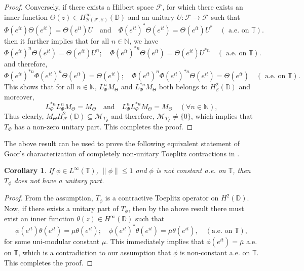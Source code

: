 \documentclass[12pt]{amsart}
\numberwithin{equation}{section}
\newtheorem{cor}[propn]{Corollary}
\theoremstyle{definition}
\newcommand{\Nat}{\mathbb{N}}
\newcommand{\D}{\mathbb{D}}
\newcommand{\T}{\mathbb{T}}
\newcommand{\1}{{\mbox{\bf 1}}}
\newcommand{\clb}{\mathcal{B}}
\newcommand{\cle}{\mathcal{E}}
\newcommand{\clf}{\mathcal{F}}
\newcommand{\clm}{\mathcal{M}}
\newcommand{\raro}{\rightarrow}
\begin{document}
\begin{proof}
Conversely, if there exists a Hilbert space $\clf$, for which there exists an inner function $\Theta(z) \in H_{\clb(\clf, \cle)}^{\infty}(\D)$ and an unitary $U: \clf \raro \clf$ such that
\[
\Phi(e^{it}) \Theta(e^{it}) = \Theta(e^{it}) U \quad \text{and} \quad  \Phi(e^{it})^* \Theta(e^{it}) = \Theta(e^{it}) U^* \quad (\text{ a.e. on }\T).
\]
then it further implies that for all $n \in \Nat$, we have
\begin{equation}
\Phi(e^{it})^n \Theta(e^{it}) =  \Theta(e^{it}) U^{n}; \quad \Phi(e^{it})^{*n} \Theta(e^{it}) =  \Theta(e^{it}) U^{*n} \quad (\text{ a.e. on }\T).
\end{equation}
and therefore,
\begin{equation}
\Phi(e^{it})^{*n} \Phi(e^{it})^n \Theta(e^{it}) =  \Theta(e^{it}); \quad \Phi(e^{it})^n \Phi(e^{it})^{*n} \Theta(e^{it}) =  \Theta(e^{it}) \quad (\text{ a.e. on }\T).
\end{equation}
This shows that for all $n \in \Nat$, $L_{\Phi}^{n} M_{\Theta}$ and $L_{\Phi}^{*n} M_{\Theta}$ both belongs to $H_{\cle}^2(\D)$ and moreover,
\[
L_{\Phi}^{*n} L_{\Phi}^{n} M_{\Theta} = M_{\Theta} \quad \text{and} \quad  L_{\Phi}^n  L_{\Phi}^{*n} M_{\Theta} = M_{\Theta} \quad (\forall n \in \Nat),
\]
Thus clearly, $M_{\Theta} H_{\clf}^2(\D)\subseteq \clm_{T_{\Phi}}$ and therefore, $\clm_{T_{\Phi}} \neq \{0\}$, which implies that $T_{\Phi}$ has a non-zero unitary part. This completes the proof.
\end{proof}

The above result can be used to prove the following equivalent statement of Goor's characterization of completely non-unitary Toeplitz contractions in \cite{Goor}.
\begin{cor}
If $\phi \in L^{\infty}(\T)$, $\|\phi\| \leq 1$ and $\phi$ is not constant a.e. on $\T$, then $T_{\phi}$ does not have a unitary part.
\end{cor}
\begin{proof}
From the assumption, $T_{\phi}$ is a contractive Toeplitz operator on $H^2(\D)$. Now, if there exists a unitary part of $T_{\phi}$, then by the above result there must exist an inner function $\theta(z) \in H^{\infty}(\D)$ such that 
\[
\phi(e^{it}) \theta(e^{it}) =   \mu  \theta(e^{it}); \quad \phi(e^{it})^* \theta(e^{it}) =\bar{\mu}  \theta(e^{it}), \quad (\text{a.e. on } \T),
\]
 for some uni-modular constant $\mu$. This immediately implies that $\phi(e^{it}) = \bar{\mu}$ a.e. on $\T$, which is a contradiction to our assumption that $\phi$ is non-constant a.e. on $\T$. This completes the proof. 
\end{proof} 
\end{document}
